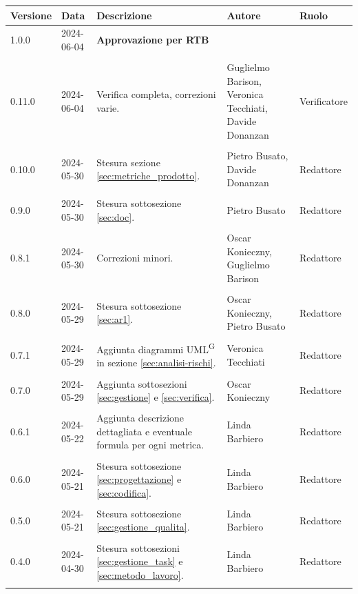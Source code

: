 \documentclass[8pt]{article}
\newcommand{\glossterm}[1]{#1\textsuperscript{G}} %
\begin{document}
\begin{table}[ht!]
\hypersetup{hidelinks}
	\centering
	\begin{tabular}{p{1.2cm} p{2cm} p{6cm} p{3cm} p{2cm}}
		\toprule
		\textbf{Versione}& \textbf{Data} & \textbf{Descrizione} & \textbf{Autore} & \textbf{Ruolo} \\
		\midrule
      1.0.0 & 2024-06-04 & \textbf{Approvazione per RTB} & & \\\\
      0.11.0 &  2024-06-04 & Verifica completa, correzioni varie. & Guglielmo Barison, Veronica Tecchiati, Davide
      Donanzan & Verificatore \\\\  
      0.10.0 & 2024-05-30 & Stesura sezione \ref{sec:metriche_prodotto}. & Pietro Busato, Davide Donanzan & Redattore \\\\
      0.9.0 & 2024-05-30 & Stesura sottosezione \ref{sec:doc}. & Pietro Busato & Redattore \\\\
		0.8.1 & 2024-05-30 & Correzioni minori. & Oscar Konieczny, Guglielmo Barison & Redattore \\\\
		0.8.0 & 2024-05-29 & Stesura sottosezione \ref{sec:ar1}. & Oscar Konieczny, Pietro Busato & Redattore \\\\ 
        0.7.1 & 2024-05-29 & Aggiunta diagrammi \glossterm{UML} in sezione \ref{sec:analisi-rischi}. & Veronica Tecchiati & Redattore \\\\
      0.7.0 & 2024-05-29 & Aggiunta sottosezioni \ref{sec:gestione} e \ref{sec:verifica}. & Oscar Konieczny & Redattore \\\\
		0.6.1 & 2024-05-22 & Aggiunta descrizione dettagliata e eventuale formula per ogni metrica. & Linda Barbiero & Redattore \\\\ %
      0.6.0 & 2024-05-21 & Stesura sottosezione \ref{sec:progettazione} e \ref{sec:codifica}. & Linda Barbiero & Redattore \\\\ %
      0.5.0 & 2024-05-21 & Stesura sottosezione \ref{sec:gestione_qualita}. & Linda Barbiero & Redattore \\\\ %
      0.4.0 & 2024-04-30 & Stesura sottosezioni \ref{sec:gestione_task} e \ref{sec:metodo_lavoro}. & Linda Barbiero & Redattore \\\\ %

\end{tabular}
\end{table}
\end{document}
